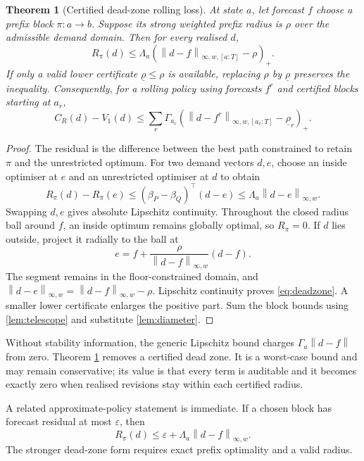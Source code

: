 \documentclass[11pt]{article}
\newtheorem{theorem}{Theorem}[section]
\theoremstyle{definition}
\newcommand{\norm}[1]{\left\lVert #1\right\rVert}
\newcommand{\pos}[1]{\left(#1\right)_{+}}
\begin{document}
\begin{theorem}[Certified dead-zone rolling loss]\label{thm:rolling}
At state $a$, let forecast $f$ choose a prefix block $\pi:a\to b$. Suppose its strong weighted prefix radius is $\rho$ over the admissible demand domain. Then for every realised $d$,
\begin{equation}\label{eq:deadzone}
R_\pi(d)
\le
\Lambda_a\pos{\norm{d-f}_{\infty,w,[a:T]}-\rho}.
\end{equation}
If only a valid lower certificate $\underline\rho\le\rho$ is available, replacing $\rho$ by $\underline\rho$ preserves the inequality. Consequently, for a rolling policy using forecasts $f^r$ and certified blocks starting at $a_r$,
\begin{equation}\label{eq:rollingbound}
C_R(d)-V_1(d)
\le
\sum_r \Gamma_{a_r}
\pos{
\norm{d-f^r}_{\infty,w,[a_r:T]}-\underline\rho_r
}.
\end{equation}
\end{theorem}

\begin{proof}
The residual is the difference between the best path constrained to retain $\pi$ and the unrestricted optimum. For two demand vectors $d,e$, choose an inside optimiser at $e$ and an unrestricted optimiser at $d$ to obtain
\[
R_\pi(d)-R_\pi(e)
\le(\beta_P-\beta_Q)^\top(d-e)
\le\Lambda_a\norm{d-e}_{\infty,w}.
\]
Swapping $d,e$ gives absolute Lipschitz continuity. Throughout the closed radius ball around $f$, an inside optimum remains globally optimal, so $R_\pi=0$. If $d$ lies outside, project it radially to the ball at
\[
e=f+\frac{\rho}{\norm{d-f}_{\infty,w}}(d-f).
\]
The segment remains in the floor-constrained domain, and $\norm{d-e}_{\infty,w}=\norm{d-f}_{\infty,w}-\rho$. Lipschitz continuity proves \eqref{eq:deadzone}. A smaller lower certificate enlarges the positive part. Sum the block bounds using \cref{lem:telescope} and substitute \cref{lem:diameter}.
\end{proof}

Without stability information, the generic Lipschitz bound charges $\Gamma_a\norm{d-f}$ from zero. Theorem \ref{thm:rolling} removes a certified dead zone. It is a worst-case bound and may remain conservative; its value is that every term is auditable and it becomes exactly zero when realised revisions stay within each certified radius.

A related approximate-policy statement is immediate. If a chosen block has forecast residual at most $\varepsilon$, then
\[
R_\pi(d)\le\varepsilon+\Lambda_a\norm{d-f}_{\infty,w}.
\]
The stronger dead-zone form requires exact prefix optimality and a valid radius.
\end{document}
